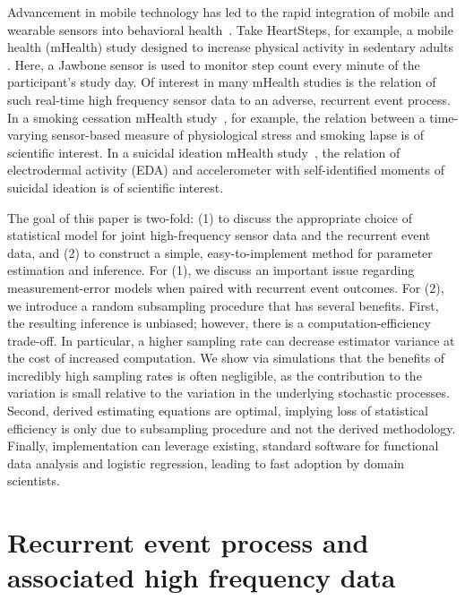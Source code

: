 \documentclass[12pt]{amsart}
\begin{document}
Advancement in mobile technology has led to the rapid integration of mobile and wearable sensors into behavioral health~\citep{Freeetal2013}. Take HeartSteps, for example, a mobile health (mHealth) study designed to increase physical activity in sedentary adults \citep{KlasnjaHS2019}. Here, a Jawbone sensor is used to monitor step count every minute of the participant's study day. Of interest in many mHealth studies is the relation of such real-time high frequency sensor data to an adverse, recurrent event process. In a smoking cessation mHealth study~\citep{Sense2Stop}, for example, the relation between a time-varying sensor-based measure of physiological stress and smoking lapse is of scientific interest. In a suicidal ideation mHealth study~\citep{Kleiman2018}, the relation of electrodermal activity (EDA) and accelerometer with self-identified moments of suicidal ideation is of scientific interest.

The goal of this paper is two-fold: (1) to discuss the appropriate choice of statistical model for joint high-frequency sensor data and the recurrent event data, and (2) to construct a simple, easy-to-implement method for parameter estimation and inference. For (1), we discuss an important issue regarding measurement-error models when paired with recurrent event outcomes. For (2), we introduce a random subsampling procedure that has several benefits.  First, the resulting inference is unbiased; however, there is a computation-efficiency trade-off. In particular, a higher sampling rate can decrease estimator variance at the cost of increased computation.  We show via simulations that the benefits of incredibly high sampling rates is often negligible, as the contribution to the variation is small relative to the variation in the underlying stochastic processes. Second, derived estimating equations are optimal, implying loss of statistical efficiency is only due to subsampling procedure and not the derived methodology.  Finally, implementation can leverage existing, standard software for functional data analysis and logistic regression, leading to fast adoption by domain scientists.

\section{Recurrent event process and associated high frequency data}
\end{document}
